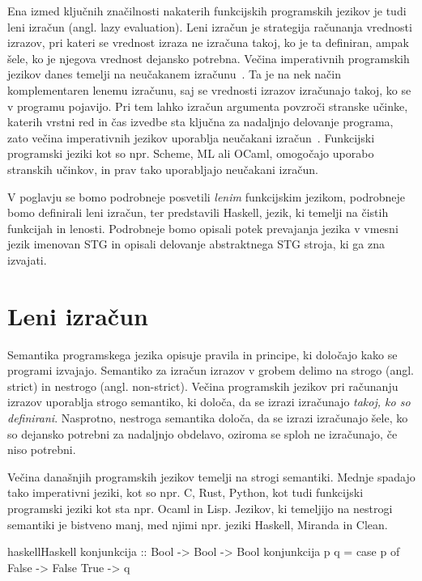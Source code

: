 Ena izmed ključnih značilnosti nakaterih funkcijskih programskih jezikov je tudi leni izračun (angl. lazy evaluation). Leni izračun je strategija računanja vrednosti izrazov, pri kateri se vrednost izraza ne izračuna takoj, ko je ta definiran, ampak šele, ko je njegova vrednost dejansko potrebna. Večina imperativnih programskih jezikov danes temelji na ne\-u\-ča\-ka\-nem iz\-ra\-ču\-nu~\cite{peyton1987implementation}. Ta je na nek način komplementaren lenemu izračunu, saj se vrednosti izrazov izračunajo takoj, ko se v programu pojavijo. Pri tem lahko izračun argumenta povzroči stranske učinke, katerih vrstni red in čas izvedbe sta ključna za nadaljnjo delovanje programa, zato večina imperativnih jezikov uporablja neučakani izračun~\cite{peyton1987implementation}. Funkcijski programski jeziki kot so npr. Scheme, ML ali OCaml, omogočajo uporabo stranskih učinkov, in prav tako uporabljajo neučakani izračun.

V poglavju se bomo podrobneje posvetili \textit{lenim} funkcijskim jezikom, podrobneje bomo definirali leni izračun, ter predstavili Haskell, jezik, ki temelji na čistih funkcijah in lenosti. Podrobneje bomo opisali potek prevajanja jezika v vmesni jezik imenovan STG in opisali delovanje abstraktnega STG stroja, ki ga zna izvajati.

\section{Leni izračun}
\label{sec:leni-izracun}

Semantika programskega jezika opisuje pravila in principe, ki določajo kako se programi izvajajo. Semantiko za izračun izrazov v grobem delimo na strogo (angl. strict) in nestrogo (angl. non-strict). Večina programskih jezikov pri računanju izrazov uporablja strogo semantiko, ki določa, da se izrazi izračunajo \textit{takoj, ko so definirani}. Nasprotno, nestroga semantika določa, da se izrazi izračunajo šele, ko so dejansko potrebni za nadaljnjo obdelavo, oziroma se sploh ne izračunajo, če niso potrebni.

Večina današnjih programskih jezikov temelji na strogi semantiki. Mednje spadajo tako imperativni jeziki, kot so npr. C, Rust, Python, kot tudi funkcijski programski jeziki kot sta npr. Ocaml in Lisp. Jezikov, ki temeljijo na nestrogi semantiki je bistveno manj, med njimi npr. jeziki Haskell, Miranda in Clean.

\begin{code-box}{haskell}{Haskell}
konjunkcija :: Bool -> Bool -> Bool
konjunkcija p q =
	case p of
		False -> False
		True -> q
\end{code-box}

